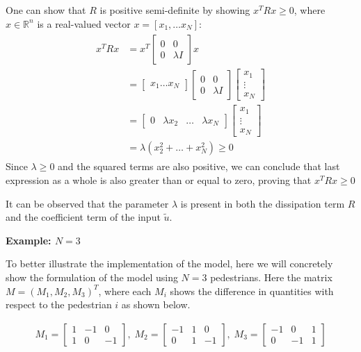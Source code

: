  One can show that $R$ is positive semi-definite by showing $x^TRx \geq 0$, where $x \in \mathbb R^n$ is a real-valued vector $ x = [x_1,\dots x_N]$:
 \begin{gather*}
    \begin{aligned}
    x^TRx&=x^T\begin{bmatrix}
        0 & 0 \\
        0 & \lambda I
    \end{bmatrix}x
    \\
    &=\begin{bmatrix}
        x_1\dots x_N
    \end{bmatrix}
    \begin{bmatrix}
        0 & 0 \\
        0 & \lambda I
    \end{bmatrix}
    \begin{bmatrix}
        x_1 \\ \vdots \\ x_N
    \end{bmatrix}
    \\
    &=\begin{bmatrix}
        0 & \lambda x_2 & \dots & \lambda x_N
    \end{bmatrix}
    \begin{bmatrix}
        x_1 \\ \vdots \\ x_N
    \end{bmatrix}
    \\
    &=\lambda(x_2^2+\dots+x_N^2) \geq 0
    \end{aligned}
 \end{gather*}
 Since $\lambda \geq 0$ and the squared terms are also positive, we can conclude that last expression as a whole is also greater than or equal to zero, proving that $x^TRx \geq 0$

 It can be observed that the parameter $\lambda$ is present in both the dissipation term $R$ and the coefficient term of the input $\tilde u$.
 
\hrulefill

\textbf{Example: $N=3$}

To better illustrate the implementation of the model, here we will concretely show the formulation of the model using $N=3$ pedestrians. Here the matrix $M = (M_1, M_2, M_3)^T$, where each $M_i$ shows the difference in quantities with respect to the pedestrian $i$ as shown below.

\begin{gather*}
    M_1 = 
    \begin{bmatrix}
        1 & -1 & 0 \\
        1 & 0 & -1 
    \end{bmatrix},\;
    M_2 = 
    \begin{bmatrix}
        -1 & 1 & 0 \\
        0 & 1 & -1 
    \end{bmatrix},\;
    M_3 = 
    \begin{bmatrix}
        -1 & 0 & 1 \\
        0 & -1 & 1 
    \end{bmatrix}
\end{gather*}


